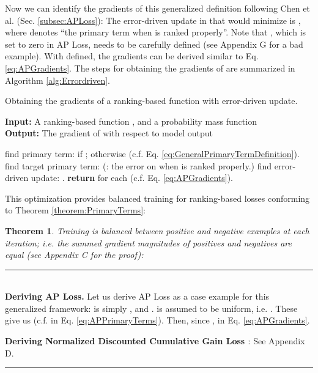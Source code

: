\documentclass{article}
\newtheorem{theorem}{Theorem}
\begin{document}
Now we can identify the gradients of this generalized definition following Chen et al. (Sec. \ref{subsec:APLoss}): The error-driven update in  that would minimize  is , where  denotes ``the primary term when  is ranked properly''. Note that , which is set to zero in AP Loss, needs to be carefully defined (see Appendix G for a bad example). With  defined, the gradients can be derived  similar to Eq. \eqref{eq:APGradients}. The steps for obtaining the gradients of  are summarized in Algorithm \ref{alg:Errordriven}.

\begin{algorithm}
\caption{Obtaining the gradients of a ranking-based function with error-driven update. \label{alg:Errordriven}}
\begin{flushleft}
\textbf{Input:} A ranking-based function , and a probability mass function  \\ 
 \textbf{Output:} The gradient of  with respect to model output 
 \end{flushleft}
\begin{algorithmic}[1]
\State  find primary term:  if ; otherwise  (c.f. Eq. \eqref{eq:GeneralPrimaryTermDefinition}).
\State  find target primary term:  (: the error on  when  is ranked properly.)
\State  find error-driven update: .
\State  \textbf{return}  for each  (c.f. Eq. \eqref{eq:APGradients}).
\end{algorithmic}
\end{algorithm}

This optimization provides balanced training for  ranking-based losses conforming to Theorem \ref{theorem:PrimaryTerms}:
\begin{theorem} 
\label{theorem:BalancedTraining}
Training is balanced between positive and negative examples at each iteration; i.e. the summed gradient magnitudes of positives and negatives are equal (see Appendix C for the proof):

\end{theorem}
\textcolor{blue}{\rule{\textwidth}{0.1mm}}\\
\textbf{Deriving AP Loss.} Let us derive AP Loss as a case example for this generalized framework:  is simply , and .  is assumed to be uniform, i.e. . These give us  (c.f.  in Eq. \eqref{eq:APPrimaryTerms}). Then, since ,  in Eq. \eqref{eq:APGradients}.

\textbf{Deriving Normalized Discounted Cumulative Gain Loss \cite{OptimizingUpperBound}}: See Appendix D.\\
\textcolor{blue}{\rule{\textwidth}{0.1mm}}
\end{document}
